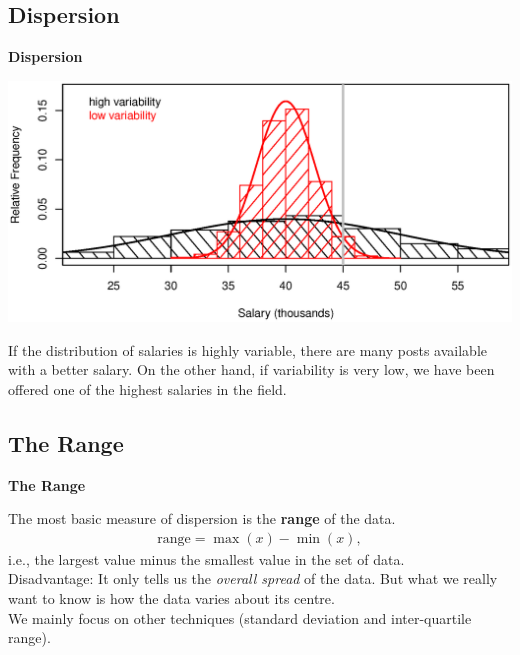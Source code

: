 \documentclass[compress]{beamer}        %
\makeatletter
\newcommand{\tcb}{\textcolor{beamer@blendedblue}}
\makeatother
\begin{document}
\subsection{Dispersion}
\begin{frame}{\bf \tcb{Dispersion}\\[-1.2cm]}
\begin{center}
\includegraphics[width=1\textwidth, trim = 0.0cm 0.6cm 0.3cm 1.5cm, clip]{Variance}
\end{center}
\vspace{-0.1cm}
If the distribution of salaries is highly variable, there are many posts available with a better salary. On the other hand, if variability is very low, we have been offered one of the highest salaries in the field.
\end{frame}


\subsection{The Range}
\begin{frame}{\bf \tcb{The Range}}

The most basic measure of dispersion is the {\bf range} of the data.\\[-0.4cm]

\begin{align*}
\boxed{\text{range} = \max(x) - \min(x)},
\end{align*}
i.e., the largest value minus the smallest value in the set of data.\\[0.8cm]

Disadvantage: It only tells us the \emph{overall spread} of the data. But what we really want to know is how the data varies about its centre.\\[0.5cm]

We mainly focus on other techniques (standard deviation and inter-quartile range).

\end{frame}
\end{document}
